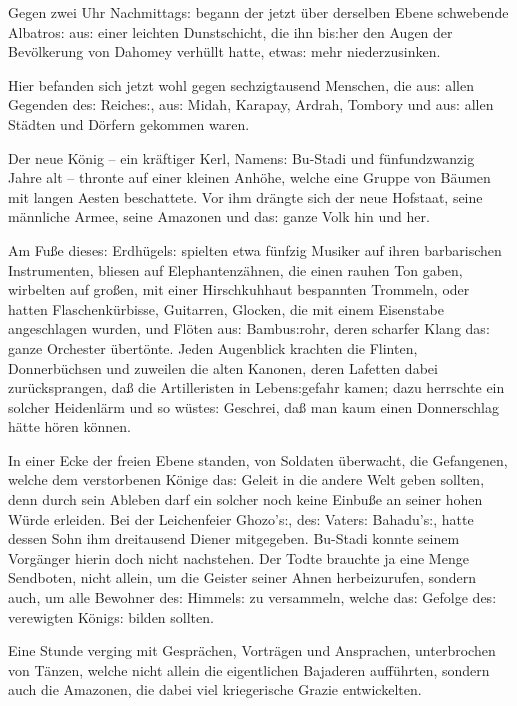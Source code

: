 \documentclass[oneside,12pt]{book}
\newcommand{\s}{s:}
\begin{document}
Gegen zwei Uhr Nachmittag{\s} begann der jetzt \"uber derselben Ebene
schwebende {\glqq}Albatro{\s}{\grqq} au{\s} einer leichten
Dunstschicht, die ihn bi{\s}her den Augen der Bev\"olkerung von
Dahomey verh\"ullt hatte, etwa{\s} mehr niederzusinken.

Hier befanden sich jetzt wohl gegen sechzigtausend Menschen, die
au{\s} allen Gegenden de{\s} Reiche{\s}, au{\s} Midah, Karapay,
Ardrah, Tombory und au{\s} allen St\"adten und D\"orfern gekommen
waren.

Der neue K\"onig -- ein kr\"aftiger Kerl, Namen{\s} Bu-Stadi und
f\"unfundzwanzig Jahre alt -- thronte auf einer kleinen Anh\"ohe,
welche eine Gruppe von B\"aumen mit langen Aesten beschattete. Vor
ihm dr\"angte sich der neue Hofstaat, seine m\"annliche Armee, seine
Amazonen und da{\s} ganze Volk hin und her.

Am Fu{\ss}e diese{\s} Erdh\"ugel{\s} spielten etwa f\"unfzig Musiker
auf ihren barbarischen Instrumenten, bliesen auf Elephantenz\"ahnen,
die einen rauhen Ton gaben, wirbelten auf gro{\ss}en, mit einer
Hirschkuhhaut bespannten Trommeln, oder hatten Flaschenk\"urbisse,
Guitarren, Glocken, die mit einem Eisenstabe angeschlagen wurden, und
Fl\"oten au{\s} Bambu{\s}rohr, deren scharfer Klang da{\s} ganze
Orchester \"ubert\"onte. Jeden Augenblick krachten die Flinten,
Donnerb\"uchsen und zuweilen die alten Kanonen, deren Lafetten dabei
zur\"ucksprangen, da{\ss} die Artilleristen in Leben{\s}gefahr kamen;
dazu herrschte ein solcher Heidenl\"arm und so w\"uste{\s} Geschrei,
da{\ss} man kaum einen Donnerschlag h\"atte h\"oren k\"onnen.

In einer Ecke der freien Ebene standen, von Soldaten \"uberwacht, die
Gefangenen, welche dem verstorbenen K\"onige da{\s} Geleit in die
andere Welt geben sollten, denn durch sein Ableben darf ein solcher
noch keine Einbu{\ss}e an seiner hohen W\"urde erleiden. Bei der
Leichenfeier Ghozo'{\s}, de{\s} Vater{\s} Bahadu'{\s}, hatte dessen
Sohn ihm dreitausend Diener mitgegeben. Bu-Stadi konnte seinem
Vorg\"anger hierin doch nicht nachstehen. Der Todte brauchte ja eine
Menge Sendboten, nicht allein, um die Geister seiner Ahnen
herbeizurufen, sondern auch, um alle Bewohner de{\s} Himmel{\s} zu
versammeln, welche da{\s} Gefolge de{\s} verewigten K\"onig{\s}
bilden sollten.

Eine Stunde verging mit Gespr\"achen, Vortr\"agen und Ansprachen,
unterbrochen von T\"anzen, welche nicht allein die eigentlichen
Bajaderen auf\/f\"uhrten, sondern auch die Amazonen, die dabei viel
kriegerische Grazie entwickelten.
\end{document}

